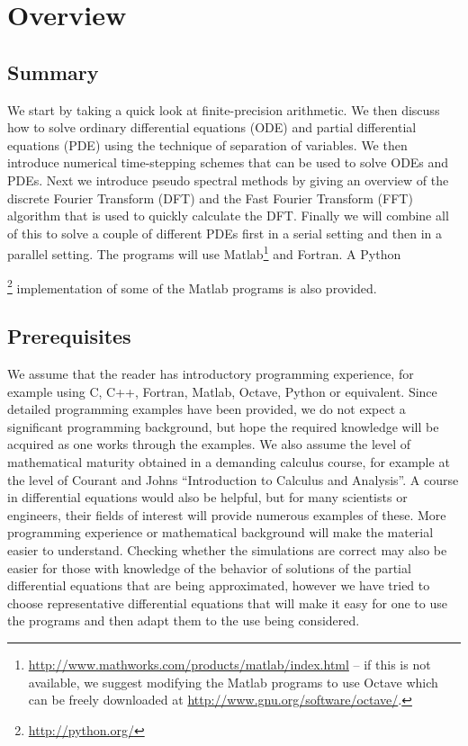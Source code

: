 \chapter{Overview}
\section{Summary}
We start by taking a quick look at finite-precision arithmetic. We then discuss how to solve ordinary differential equations (ODE) and partial differential equations (PDE) using the technique of separation of variables. We then introduce numerical time-stepping schemes that can be used to solve ODEs and PDEs. Next we introduce pseudo spectral methods by giving an overview of the discrete Fourier Transform (DFT) and the Fast Fourier Transform (FFT) algorithm that is used to quickly calculate the DFT. Finally we will combine all of this to solve a couple of different PDEs first in a serial setting and then in a parallel setting. The programs will use Matlab\footnote{\url{http://www.mathworks.com/products/matlab/index.html} -- if this is not available, we suggest modifying the Matlab programs to use Octave which can be freely downloaded at {\url{http://www.gnu.org/software/octave/}}.} and Fortran. A Python{\footnote{\url{http://python.org/}} implementation of some of the Matlab programs is also provided. 

\section{Prerequisites}
We assume that the reader has introductory programming experience, for example using C, C++, Fortran, Matlab, Octave, Python or equivalent. Since detailed programming examples have been provided, we do not expect a significant programming background, but hope the required knowledge will be acquired as one works through the examples. We also assume the level of mathematical maturity obtained in a demanding calculus course, for example at the level of Courant and Johns ``Introduction to Calculus and Analysis''. A course in differential equations would also be helpful, but for many scientists or engineers, their fields of interest will provide numerous examples of these. More programming experience or mathematical background will make the material easier to understand. Checking whether the simulations are correct may also be easier for those with knowledge of the behavior of solutions of the partial differential equations that are being approximated, however we have tried to choose representative differential equations that will make it easy for one to use the programs and then adapt them to the use being considered.  

}
